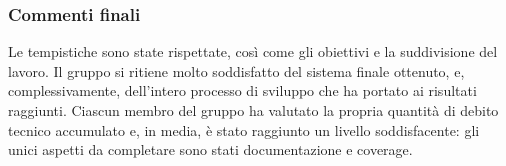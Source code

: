\subsubsection*{Commenti finali}
Le tempistiche sono state rispettate, così come gli obiettivi e la suddivisione del lavoro. Il gruppo si ritiene molto
soddisfatto del sistema finale ottenuto, e, complessivamente, dell'intero processo di sviluppo che ha portato ai
risultati raggiunti. Ciascun membro del gruppo ha valutato la propria quantità di debito tecnico accumulato e, in media,
è stato raggiunto un livello soddisfacente: gli unici aspetti da completare sono stati documentazione e coverage.
